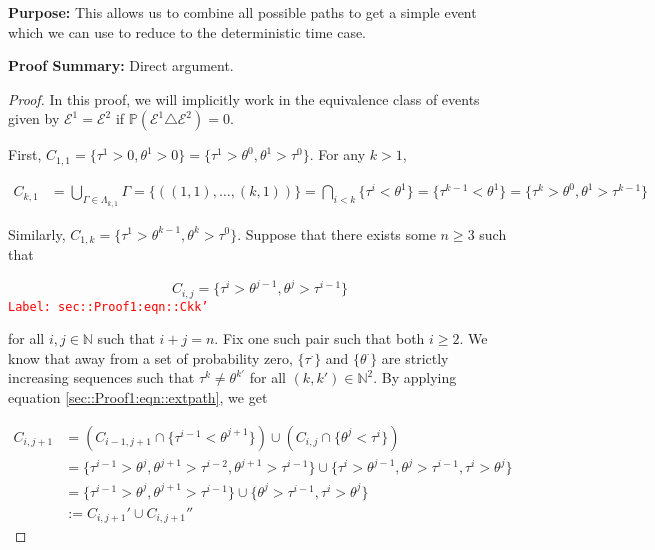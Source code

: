 \documentclass[12pt]{article}
\newcommand{\mb}{\mathbb}
\newcommand{\mc}{\mathcal}
\newcommand{\tr}{\textcolor{red}}
\newcommand{\labe}[1]{\tr{\texttt{Label: #1}}}
\newcommand{\purpose}{\textbf{Purpose: }}
\newcommand{\pfsum}{\textbf{Proof Summary: }}
\newcommand{\ind}{\hspace{24pt}}
\newcommand{\pr}{\mb{P}}							%
\newcommand{\rt}[1]{\tau^{#1}}						%
\newcommand{\rtt}[1]{\theta^{#1}}					%
\renewcommand{\it}{k}								%
\newcommand{\itt}{i}								%
\newcommand{\ittt}{j}								%
\newcommand{\numb}{n}								%
\newcommand{\apath}{\Gamma}						%
\newcommand{\pathset}[2]{\Lambda_{#1,#2}}			%
\newcommand{\pathsete}[2]{C_{#1,#2}}			%
\newcommand{\evnt}{\mc{E}}						%
\begin{document}
\purpose This allows us to combine all possible paths to get a simple event which we can use to reduce to the deterministic time case.

\pfsum Direct argument.

\begin{proof}
In this proof, we will implicitly work in the equivalence class of events given by \(\evnt^1 = \evnt^2\) if \(\pr(\evnt^1 \triangle \evnt^2) = 0\).  

\ind First, \(\pathsete{1}{1} = \{\rt{1} > 0,\rtt{1} > 0\} = \{\rt{1} > \rtt{0},\rtt{1}>\rt{0}\}\). For any \(\it > 1\),

\begin{align*}
\pathsete{\it}{1} &= \bigcup_{\apath \in \pathset{\it}{1}} \apath = \{((1,1),\dots,(\it,1))\} = \bigcap_{\itt < \it} \{\rt{\itt} < \rtt{1}\} = \{\rt{\it-1} < \rtt{1}\} = \{\rt{\it} > \rtt{0},\rtt{1} > \rt{\it-1}\}
\end{align*}

Similarly, \(\pathsete{1}{\it} = \{\rt{1} > \rtt{\it-1}, \rtt{\it} > \rt{0}\}\). Suppose that there exists some \(\numb\geq 3\) such that

\begin{equation}
\pathsete{\itt}{\ittt} = \{\rt{\itt} > \rtt{\ittt-1},\rtt{\ittt} > \rt{\itt-1}\}
\label{sec::Proof1:eqn::Ckk'}
\end{equation}
\labe{sec::Proof1:eqn::Ckk'}

for all \(\itt, \ittt\in \mb{N}\) such that \(\itt+\ittt = \numb\). Fix one such pair such that both \(\itt \geq 2\). We know that away from a set of probability zero, \(\{\rt{\cdot}\}\) and \(\{\rtt{\cdot}\}\) are strictly increasing sequences such that \(\rt{\it} \neq \rtt{\it'}\) for all \((\it,\it')\in \mb{N}^2\). By applying equation \eqref{sec::Proof1:eqn::extpath}, we get

\begin{align*}
\pathsete{\itt}{\ittt+1} &= \left(\pathsete{\itt-1}{\ittt+1} \cap \{\rt{\itt - 1} < \rtt{\ittt+1}\}\right) \cup \left(\pathsete{\itt}{\ittt}\cap \{\rtt{\ittt} < \rt{\itt}\}\right)\\
&= \{\rt{\itt - 1} > \rtt{\ittt}, \rtt{\ittt+1} > \rt{\itt - 2},  \rtt{\ittt+1} > \rt{\itt -1}\}\cup\{\rt{\itt} > \rtt{\ittt-1}, \rtt{\ittt} > \rt{\itt - 1},\rt{\itt} > \rtt{\ittt}\}\\
&= \{\rt{\itt - 1} > \rtt{\ittt}, \rtt{\ittt+1} > \rt{\itt - 1}\}\cup\{\rtt{\ittt} > \rt{\itt - 1},\rt{\itt} > \rtt{\ittt}\}\\
&:= \pathsete{\itt}{\ittt+1}' \cup\pathsete{\itt}{\ittt+1}''
\end{align*}


\end{proof}
\end{document}
